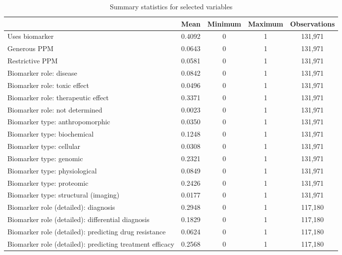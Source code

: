 \begin{table}[htbp]\centering
\def\sym#1{\ifmmode^{#1}\else\(^{#1}\)\fi}
\caption{Summary statistics for selected variables}
\begin{tabular}{l*{1}{cccc}}
\hline\hline
                    &        Mean&     Minimum&     Maximum&Observations\\
\hline
Uses biomarker      &      0.4092&           0&           1&     131,971\\
Generous PPM        &      0.0643&           0&           1&     131,971\\
Restrictive PPM     &      0.0581&           0&           1&     131,971\\
Biomarker role: disease&      0.0842&           0&           1&     131,971\\
Biomarker role: toxic effect&      0.0496&           0&           1&     131,971\\
Biomarker role: therapeutic effect&      0.3371&           0&           1&     131,971\\
Biomarker role: not determined&      0.0023&           0&           1&     131,971\\
Biomarker type: anthropomorphic&      0.0350&           0&           1&     131,971\\
Biomarker type: biochemical&      0.1248&           0&           1&     131,971\\
Biomarker type: cellular&      0.0308&           0&           1&     131,971\\
Biomarker type: genomic&      0.2321&           0&           1&     131,971\\
Biomarker type: physiological&      0.0849&           0&           1&     131,971\\
Biomarker type: proteomic&      0.2426&           0&           1&     131,971\\
Biomarker type: structural (imaging)&      0.0177&           0&           1&     131,971\\
Biomarker role (detailed): diagnosis&      0.2948&           0&           1&     117,180\\
Biomarker role (detailed): differential diagnosis&      0.1829&           0&           1&     117,180\\
Biomarker role (detailed): predicting drug resistance&      0.0624&           0&           1&     117,180\\
Biomarker role (detailed): predicting treatment efficacy&      0.2568&           0&           1&     117,180\\

\end{tabular}
\end{table}
